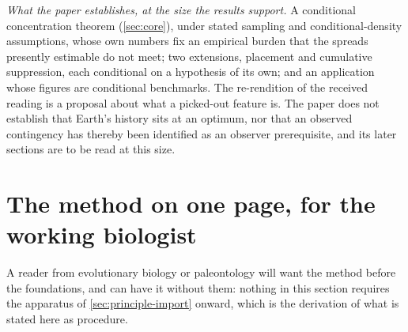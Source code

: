 \documentclass[11pt]{article}
\theoremstyle{definition}
\begin{document}
\noindent\textit{What the paper establishes, at the size the results support.} A conditional concentration theorem (\autoref{sec:core}), under stated sampling and conditional-density assumptions, whose own numbers fix an empirical burden that the spreads presently estimable do not meet; two extensions, placement and cumulative suppression, each conditional on a hypothesis of its own; and an application whose figures are conditional benchmarks. The re-rendition of the received reading is a proposal about what a picked-out feature is. The paper does not establish that Earth's history sits at an optimum, nor that an observed contingency has thereby been identified as an observer prerequisite, and its later sections are to be read at this size.

\section{The method on one page, for the working biologist}\label{sec:method-one-page}

A reader from evolutionary biology or paleontology will want the method before the foundations, and can have it without them: nothing in this section requires the apparatus of \autoref{sec:principle-import} onward, which is the derivation of what is stated here as procedure.
\end{document}
